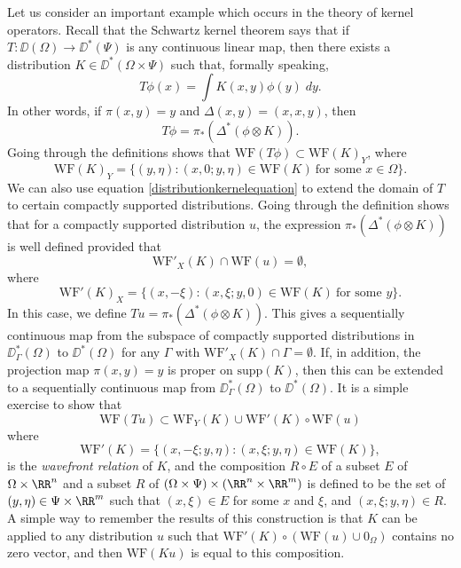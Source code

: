 Let us consider an important example which occurs in the theory of kernel operators. Recall that the Schwartz kernel theorem says that if $T: \DD(\Omega) \to \DD^*(\Psi)$ is any continuous linear map, then there exists a distribution $K \in \DD^*(\Omega \times \Psi)$ such that, formally speaking,
%
\[ T\phi(x) = \int K(x,y) \phi(y)\; dy. \]
%
In other words, if $\pi(x,y) = y$ and $\Delta(x,y) = (x,x,y)$, then
%
\begin{equation} \label{distributionkernelequation}
    T\phi = \pi_*(\Delta^* (\phi \otimes K)).
\end{equation}
%
Going through the definitions shows that $\text{WF}(T\phi) \subset \text{WF}(K)_Y$, where
%
\[ \text{WF}(K)_Y = \{ (y,\eta) : (x,0;y,\eta) \in \text{WF}(K)\ \text{for some $x \in \Omega$} \}. \]
%
We can also use equation \eqref{distributionkernelequation} to extend the domain of $T$ to certain compactly supported distributions. Going through the definition shows that for a compactly supported distribution $u$, the expression $\pi_*(\Delta^*(\phi \otimes K))$ is well defined provided that
%
\[ \text{WF}'_X(K) \cap \text{WF}(u) = \emptyset, \]
%
where
%
\[ \text{WF}'(K)_X = \{ (x,-\xi) : (x,\xi;y,0) \in \text{WF}(K)\ \text{for some $y$} \}. \]
%
In this case, we define $Tu = \pi_*(\Delta^*(\phi \otimes K))$. This gives a sequentially continuous map from the subspace of compactly supported distributions in $\DD^*_\Gamma(\Omega)$ to $\DD^*(\Omega)$ for any $\Gamma$ with $\text{WF}'_X(K) \cap \Gamma = \emptyset$. If, in addition, the projection map $\pi(x,y) = y$ is proper on $\text{supp}(K)$, then this can be extended to a sequentially continuous map from $\DD^*_\Gamma(\Omega)$ to $\DD^*(\Omega)$. It is a simple exercise to show that
%
\[ \text{WF}(Tu) \subset \text{WF}_Y(K) \cup \text{WF}'(K) \circ \text{WF}(u) \]
%
where
%
\[ \text{WF}'(K) = \{ (x,-\xi;y,\eta) : (x,\xi;y,\eta) \in \text{WF}(K) \}, \]
%
is the \emph{wavefront relation} of $K$, and the composition $R \circ E$ of a subset $E$ of $\Omega \times \RR^n$ and a subset $R$ of $(\Omega \times \Psi) \times (\RR^n \times \RR^m)$ is defined to be the set of $(y,\eta) \in \Psi \times \RR^m$ such that $(x,\xi) \in E$ for some $x$ and $\xi$, and $(x,\xi;y,\eta) \in R$. A simple way to remember the results of this construction is that $K$ can be applied to any distribution $u$ such that $\text{WF}'(K) \circ (\text{WF}(u) \cup 0_\Omega)$ contains no zero vector, and then $\text{WF}(Ku)$ is equal to this composition.


